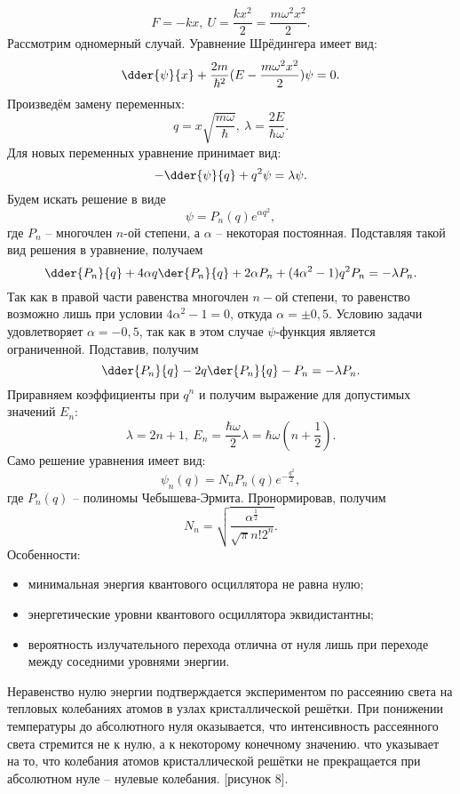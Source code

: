 \[
    F = -kx,\ U = \frac{kx^2}{2} = \frac{m\omega^2x^2}{2}.
\]
Рассмотрим одномерный случай. Уравнение Шрёдингера имеет вид:
\[
    \dder{\psi}{x} + \frac{2m}{\hbar^2}(E - \frac{m\omega^2x^2}{2})\psi = 0.
\]
Произведём замену переменных:
\[
    q = x\sqrt{\frac{m\omega}{\hbar}},\ \lambda = \frac{2E}{\hbar\omega}.
\]
Для новых переменных уравнение принимает вид:
\[
    -\dder{\psi}{q} + q^2\psi = \lambda\psi.
\]
Будем искать решение в виде
\[
    \psi = P_n(q)e^{\alpha q^2},
\]
где \( P_n \) -- многочлен \( n \)-ой степени, а \( \alpha \) -- некоторая
постоянная. Подставляя такой вид решения в уравнение, получаем
\[
    \dder{P_n}{q} + 4\alpha q\der{P_n}{q} + 2\alpha P_n + (4\alpha^2 -1)q^2P_n =
    -\lambda P_n.
\]
Так как в правой части равенства многочлен \( n-\text{ой} \) степени, то
равенство возможно лишь при условии \( 4\alpha^2 - 1 = 0 \), откуда
\( \alpha = \pm0,5 \). Условию задачи удовлетворяет \( \alpha = -0,5 \), так как
в этом случае \( \psi \)-функция является ограниченной. Подставив, получим
\[
    \dder{P_n}{q} - 2q\der{P_n}{q} - P_n = -\lambda P_n.
\]
Приравняем коэффициенты при \( q^n \) и получим выражение для допустимых
значений \( E_n \):
\[
    \lambda = 2n+1,\ E_n = \frac{\hbar\omega}{2}\lambda =
    \hbar\omega\left(n+\frac{1}{2}\right).
\]
Само решение уравнения имеет вид:
\[
    \psi_n(q) = N_nP_n(q)e^{-\frac{q^2}{2}},
\]
где \( P_n(q) \) -- полиномы Чебышева-Эрмита. Пронормировав, получим
\[
    N_n = \sqrt{\frac{\alpha^\frac{1}{2}}{\sqrt{\pi}n!2^n}}.
\]
Особенности:
\begin{itemize}
    \item минимальная энергия квантового осциллятора не равна нулю;
    \item энергетические уровни квантового осциллятора эквидистантны;
    \item вероятность излучательного перехода отлична от нуля лишь при переходе
    между соседними уровнями энергии.
\end{itemize}

Неравенство нулю энергии подтверждается экспериментом по рассеянию света на
тепловых колебаниях атомов в узлах кристаллической решётки. При понижении
температуры до абсолютного нуля оказывается, что интенсивность рассеянного света
стремится не к нулю, а к некоторому конечному значению. что указывает на то, что
колебания атомов кристаллической решётки не прекращается при абсолютном нуле -- 
нулевые колебания.
[рисунок 8].

\newpage
